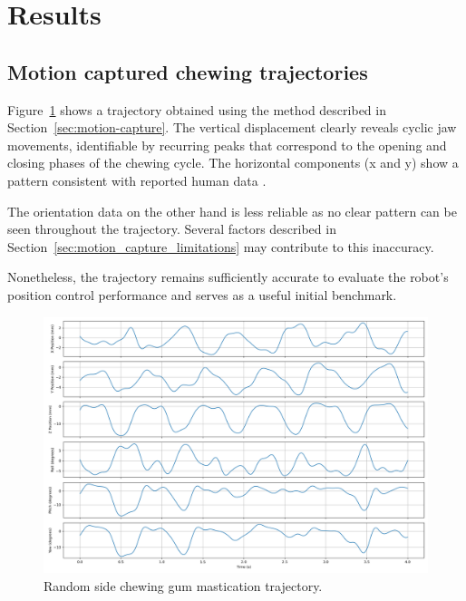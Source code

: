\section{Results}
\subsection{Motion captured chewing trajectories}
\label{sec:traj_result}

Figure~\ref{fig:trajectory_plot} shows a trajectory obtained using the method described in Section~\ref{sec:motion-capture}. The vertical displacement clearly reveals cyclic jaw movements, 
identifiable by recurring peaks that correspond to the opening and closing 
phases of the chewing cycle. The horizontal components (x and y) show a pattern consistent with reported human data \cite{chewing_traj}.

The orientation data on the other hand is less reliable as no clear pattern can be seen throughout the trajectory. Several factors described in Section~\ref{sec:motion_capture_limitations} 
may contribute to this inaccuracy. 

Nonetheless, the trajectory remains sufficiently accurate to evaluate the robot's position control performance and serves as a useful initial 
benchmark.


\begin{figure}[H]
    \centering
    \includegraphics[width=\textwidth]{figures/trajectory_plot.png}
    \caption{Random side chewing gum mastication trajectory.}
    \label{fig:trajectory_plot}
\end{figure}

